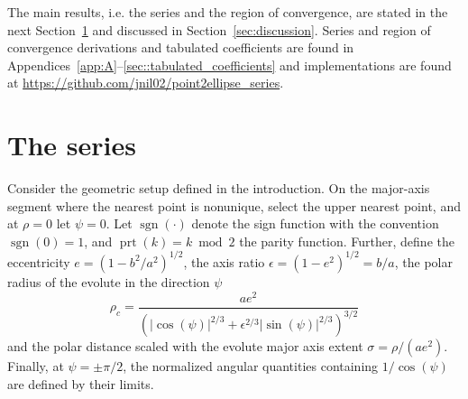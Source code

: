 \documentclass[a4paper]{amsart}
\DeclareMathOperator{\sgn}{sgn}
\DeclareMathOperator{\prt}{prt}
\begin{document}
The main results, i.e. the series and the region of convergence, are stated in the next Section~\ref{sec:the_series} and discussed in Section~\ref{sec:discussion}. Series and region of convergence derivations and tabulated coefficients are found in Appendices~\ref{app:A}--\ref{sec::tabulated_coefficients} and implementations are found at \url{https://github.com/jnil02/point2ellipse_series}.

\section{The series}\label{sec:the_series}
Consider the geometric setup defined in the introduction. On the major-axis segment where the nearest point is nonunique, select the upper nearest point, and at $\rho=0$ let $\psi=0$. Let $\sgn(\cdot)$ denote the sign function with the convention $\sgn(0)=1$, and $\prt(k)=k\bmod 2$ the parity function.
%
Further, define the eccentricity $e = (1-b^2/a^2)^{1/2}$, the axis ratio $\epsilon = (1-e^2)^{1/2}=b/a$, the polar radius of the evolute in the direction $\psi$
\begin{equation*}
\rho_c= \frac{ae^2}
{\left(|\cos(\psi)|^{2/3}+\epsilon^{2/3}|\sin(\psi)|^{2/3}\right)^{3/2}}
\end{equation*}
and the polar distance scaled with the evolute major axis extent $\sigma=\rho/(ae^2)$. Finally, at $\psi=\pm\pi/2$, the normalized angular quantities containing $1/\cos(\psi)$ are defined by their limits.
\end{document}

